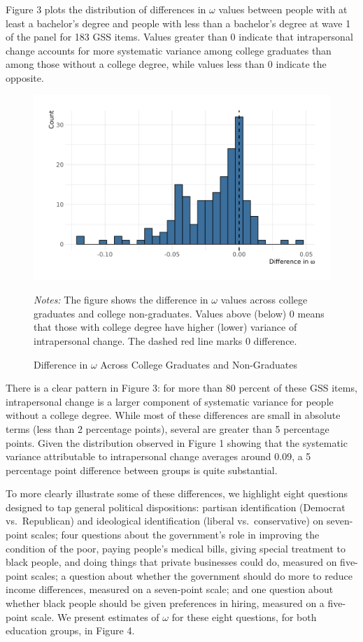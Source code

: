\documentclass[
  12pt,
]{article}
\begin{document}
Figure 3 plots the distribution of differences in \(\omega\) values
between people with at least a bachelor's degree and people with less
than a bachelor's degree at wave 1 of the panel for 183 GSS items.
Values greater than 0 indicate that intrapersonal change accounts for
more systematic variance among college graduates than among those
without a college degree, while values less than 0 indicate the
opposite.

\begin{figure}[hbt]
\begin{center}
\caption{Difference in $\omega$ Across College Graduates and Non-Graduates}

\includegraphics[width=450px]{../figures/figure_3}

\end{center}
\footnotesize{\textit{Notes:} The figure shows the difference in $\omega$ values across college graduates and college non-graduates. Values above (below) 0 means that those with college degree have higher (lower) variance of intrapersonal change. The dashed red line marks 0 difference.}
\end{figure}

There is a clear pattern in Figure 3: for more than 80 percent of these
GSS items, intrapersonal change is a larger component of systematic
variance for people without a college degree. While most of these
differences are small in absolute terms (less than 2 percentage points),
several are greater than 5 percentage points. Given the distribution
observed in Figure 1 showing that the systematic variance attributable
to intrapersonal change averages around 0.09, a 5 percentage point
difference between groups is quite substantial.

To more clearly illustrate some of these differences, we highlight eight
questions designed to tap general political dispositions: partisan
identification (Democrat vs.~Republican) and ideological identification
(liberal vs.~conservative) on seven-point scales; four questions about
the government's role in improving the condition of the poor, paying
people's medical bills, giving special treatment to black people, and
doing things that private businesses could do, measured on five-point
scales; a question about whether the government should do more to reduce
income differences, measured on a seven-point scale; and one question
about whether black people should be given preferences in hiring,
measured on a five-point scale. We present estimates of \(\omega\) for
these eight questions, for both education groups, in Figure 4.
\end{document}
